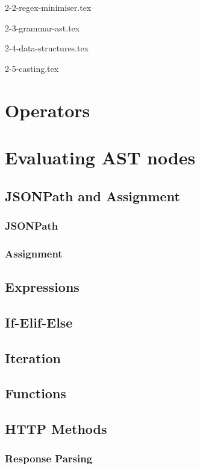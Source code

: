 \documentclass[]{full}
\theoremstyle{definition}
\begin{document}
{2-2-regex-minimiser.tex}

{2-3-grammar-ast.tex}

{2-4-data-structures.tex}

{2-5-casting.tex}

\section{Operators}

\section{Evaluating AST nodes}

\subsection{JSONPath and Assignment}

\subsubsection{JSONPath}

\subsubsection{Assignment}

\subsection{Expressions}

\subsection{If-Elif-Else}

\subsection{Iteration}

\subsection{Functions}

\subsection{HTTP Methods}

\subsubsection{Response Parsing}
\end{document}
